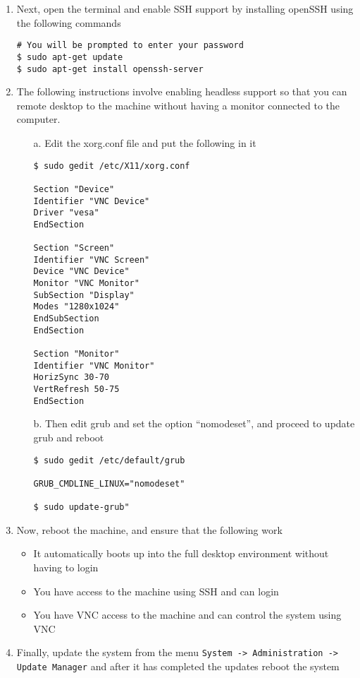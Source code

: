 \begin{enumerate}
\item	Next, open the terminal and enable SSH support by installing openSSH using the following commands
\lstset{}
\begin{lstlisting}
# You will be prompted to enter your password
$ sudo apt-get update
$ sudo apt-get install openssh-server
\end{lstlisting}

\item 	The following instructions involve enabling headless support so that you can remote desktop to the machine without having a 
		monitor connected to the computer.
\begin{itemize}
\item[a.] Edit the xorg.conf file and put the following in it
\lstset{caption=Configuring Xorg for Headless Support}
\begin{lstlisting}
$ sudo gedit /etc/X11/xorg.conf

Section "Device"
Identifier "VNC Device"
Driver "vesa"
EndSection

Section "Screen"
Identifier "VNC Screen"
Device "VNC Device"
Monitor "VNC Monitor"
SubSection "Display"
Modes "1280x1024"
EndSubSection
EndSection

Section "Monitor"
Identifier "VNC Monitor"
HorizSync 30-70
VertRefresh 50-75
EndSection
\end{lstlisting}
	
\item[b.] Then edit grub and set the option ``nomodeset'', and proceed to update grub and reboot
\lstset{caption=Configuring Grub for Headless Support}
\begin{lstlisting}
$ sudo gedit /etc/default/grub

GRUB_CMDLINE_LINUX="nomodeset"

$ sudo update-grub"
\end{lstlisting}
\end{itemize}

\item	Now, reboot the machine, and ensure that the following work
\begin{itemize}
\item	It automatically boots up into the full desktop environment without having to login
\item	You have access to the machine using SSH and can login
\item	You have VNC access to the machine and can control the system using VNC	
\end{itemize}

\item	Finally, update the system from the menu \verb|System -> Administration -> Update Manager| and after it has 
		completed the updates reboot the system
\end{enumerate}


